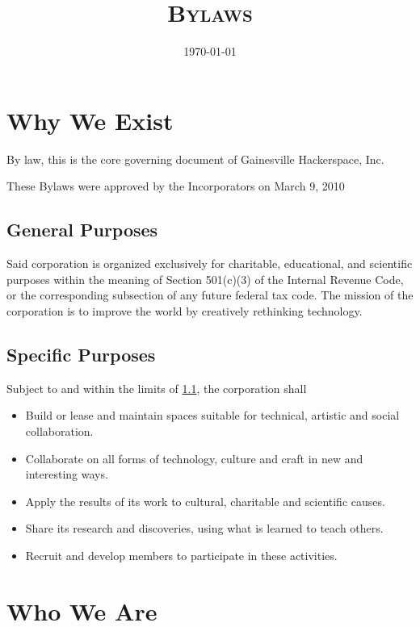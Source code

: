 \documentclass[10pt,letterpaper,titlepage]{article}
\title{%
    \textsc{\LARGE \corpname \\
    \Large Bylaws
    }
}
\date{\today}
\newcommand\corpname{Gainesville Hackerspace, Inc.}
\newcommand\approvaldate{March 9, 2010}
\begin{document}
\maketitle

\tableofcontents
\newpage

\section{Why We Exist}
\label{whyweexist}

By law, this is the core governing document of \corpname

These Bylaws were approved by the Incorporators on \approvaldate

\subsection{General Purposes}
\label{genpurp}

Said corporation is organized exclusively for charitable, educational, and
scientific purposes within the meaning of Section 501(c)(3) of the Internal
Revenue Code, or the corresponding subsection of any future federal tax code.
The mission of the corporation is to improve the world by creatively rethinking
technology.

\subsection{Specific Purposes}

Subject to and within the limits of \ref{genpurp}, the corporation shall
\begin{itemize}
    \item Build or lease and maintain spaces suitable for technical, artistic
          and social collaboration.
    \item Collaborate on all forms of technology, culture and craft in new and
          interesting ways.
    \item Apply the results of its work to cultural, charitable and
          scientific causes.
    \item Share its research and discoveries, using what is learned to
          teach others.
    \item Recruit and develop members to participate in these activities.
\end{itemize}

\section{Who We Are}
\end{document}
